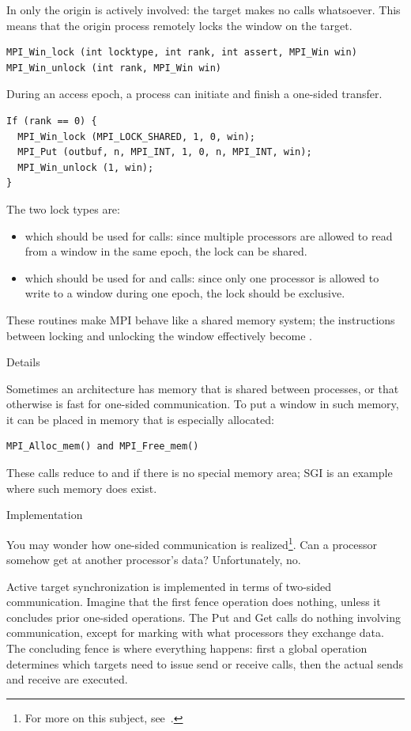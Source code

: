 In  only the origin is
actively involved: the target makes no calls whatsoever.
This means that the origin process remotely locks the window
on the target.
\begin{verbatim}
MPI_Win_lock (int locktype, int rank, int assert, MPI_Win win)
MPI_Win_unlock (int rank, MPI_Win win)
\end{verbatim}
During an access epoch, a process can initiate and finish a one-sided
transfer.
\begin{verbatim}
If (rank == 0) {
  MPI_Win_lock (MPI_LOCK_SHARED, 1, 0, win);
  MPI_Put (outbuf, n, MPI_INT, 1, 0, n, MPI_INT, win);
  MPI_Win_unlock (1, win);
}
\end{verbatim}
The two lock types are:
\begin{itemize}
\item {} which should be used for 
  calls: since multiple processors are allowed to read from a window
  in the same epoch, the lock can be shared.
\item {} which should be used for
   and  calls: since only one processor is
  allowed to write to a window during one epoch, the lock should be
  exclusive.
\end{itemize}
These routines make MPI behave like a shared memory system; the
instructions between locking and unlocking the window effectively
become .

 {Details}
\label{sec:mpi-alloc}

Sometimes an architecture has memory that is shared between processes,
or that otherwise is fast for one-sided communication. To put a window
in such memory, it can be placed in memory that is especially
allocated:
\begin{verbatim}
MPI_Alloc_mem() and MPI_Free_mem()
\end{verbatim}
These calls reduce to  and  if there is no special
memory area; SGI is an example where such memory does exist.

 {Implementation}

You may wonder how one-sided communication is realized\footnote{For
  more on this subject, see~\cite{thakur:ijhpca-sync}.}. Can a processor
somehow get at another processor's data? Unfortunately, no.

Active target synchronization is implemented in terms of two-sided communication.
Imagine that the first fence operation does nothing, unless it concludes prior
one-sided operations. The Put and Get calls do nothing involving communication,
except for marking with what processors they exchange data.
The concluding fence is where everything happens: first a global operation
determines which targets need to issue send or receive calls, then the
actual sends and receive are executed.

